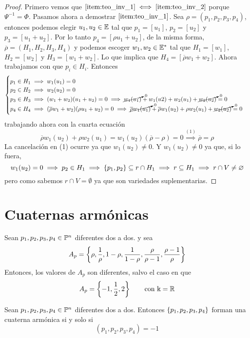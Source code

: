\begin{proof}
 Primero vemos que $\ref{item:teo_inv_1} \iff \ref{item:teo_inv_2}$ porque $\Psi^{-1}=\Phi$. Pasamos ahora
 a demostrar $\ref{item:teo_inv_1}$. Sea $\rho = (p_1,p_2,p_3,p_4)$, entonces podemos elegir $u_1,u_2 \in \mathbb{E}$
 tal que $p_1 = [u_1]$, $p_2=[u_2]$ y $p_3=[u_1+u_2]$. Por lo tanto $p_4 = [\rho u_1+u_2]$, de la misma forma,
 $\overline{\rho} = (H_1,H_2,H_3,H_4)$ y podemos escoger $w_1,w_2 \in \mathbb{E}^*$ tal que $H_1 = [w_1]$, $H_2 = [w_2]$ y
 $H_3=[w_1+w_2]$. Lo que implica que $H_4 = [\overline{\rho} w_1 + w_2]$. Ahora trabajamos con que $p_i \in H_i$.
 Entonces
 \[
  \begin{cases}
    p_1 \in H_1 \implies w_1(u_1) = 0 \\
    p_2 \in H_2 \implies w_2(u_2) = 0 \\
    p_3 \in H_3 \implies (w_1+w_2)(u_1+u_2) = 0 \implies \cancelto{0}{w_1(u_1)} + w_1(u2) + w_2(u_1) + \cancelto{0}{w_2(u_2)} = 0 \\
    p_4 \in H_4 \implies (\overline{\rho}w_1+w_2)(\rho u_1+u_2) = 0 \implies \cancelto{0}{\overline{\rho}w_1(u_1)} + \overline{\rho}w_1(u_2) +
      \rho w_2(u_1) + \cancelto{0}{w_2(u_2)} = 0
  \end{cases}
 \]
 trabajando ahora con la cuarta ecuación
 \[
  \overline{\rho}w_1(u_2) + \rho w_2(u_1) = w_1(u_2)(\overline{\rho} - \rho) = 0 \stackrel{(1)}{\implies} \overline{\rho} = \rho
 \]
 La cancelación en (1) ocurre ya que $w_1(u_2) \neq 0$. Y $w_1(u_2) \neq 0$ ya que, si lo fuera,
 \[
  w_1(u_2) = 0 \implies p_2 \in H_1 \implies \left\{p_1,p_2\right\} \subseteq r \cap H_1 \implies r \subseteq H_1 \implies r \cap V \neq \varnothing
 \]
 pero como sabemos $r \cap V = \emptyset$ ya que son variedades suplementarias.
\end{proof}

\section{Cuaternas armónicas}

\begin{obs}
 Sean $p_1,p_2,p_3,p_4 \in \mathbb{P}^n$ diferentes dos a dos. y sea
 \[
  A_p = \left\{\rho, \frac{1}{\rho}, 1-\rho, \frac{1}{1-\rho}, \frac{\rho}{\rho-1},\frac{\rho-1}{\rho}\right\}
 \]
 Entonces, los valores de $A_p$ son diferentes, salvo el caso en que
 \[
  A_p = \left\{-1,\frac{1}{2},2\right\} \qquad \text{con $\Bbbk = \mathbb{R}$}
 \]
\end{obs}

\begin{defi}
 Sean $p_1,p_2,p_3,p_4 \in \mathbb{P}^n$ diferentes dos a dos. Entonces $\left\{p_1,p_2,p_3,p_4\right\}$ forman
 una cuaterna armónica si y solo si
 \[
  (p_1,p_2,p_3,p_4) = -1
 \]
\end{defi}

